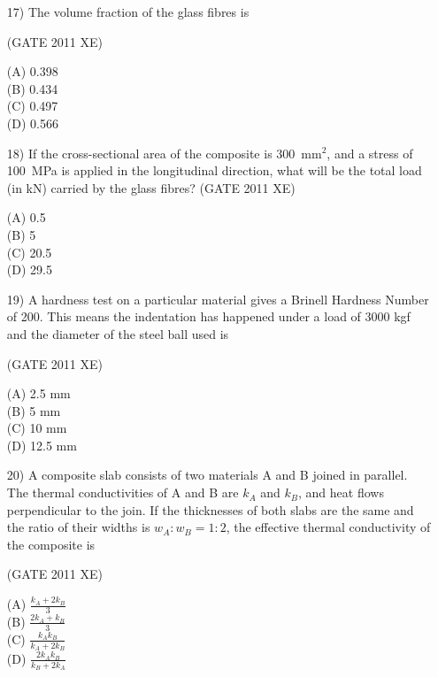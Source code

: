\documentclass[journal,12pt,onecolumn]{IEEEtran}
\begin{document}
\begin{enumerate}
\item[17)] The volume fraction of the glass fibres is

\hfill{(GATE 2011 XE)}\\
\begin{multicols}{4}
(A) 0.398 \\
(B) 0.434 \\
(C) 0.497 \\
(D) 0.566
\end{multicols}

\item[18)] If the cross-sectional area of the composite is 300~mm$^2$, and a stress of 100~MPa is applied in the longitudinal direction, what will be the total load (in kN) carried by the glass fibres?
\hfill{(GATE 2011 XE)}\\
\begin{multicols}{4}
(A) 0.5 \\
(B) 5 \\
(C) 20.5 \\
(D) 29.5
\end{multicols}

\newpage
\item[19)] A hardness test on a particular material gives a Brinell Hardness Number of 200. This means the indentation has happened under a load of 3000 kgf and the diameter of the steel ball used is

\hfill{(GATE 2011 XE)}\\
\begin{multicols}{4}
(A) 2.5 mm \\
(B) 5 mm \\
(C) 10 mm \\
(D) 12.5 mm
\end{multicols}


\item[20)] A composite slab consists of two materials A and B joined in parallel. The thermal conductivities of A and B are $k_A$ and $k_B$, and heat flows perpendicular to the join. If the thicknesses of both slabs are the same and the ratio of their widths is $w_A : w_B = 1:2$, the effective thermal conductivity of the composite is

\hfill{(GATE 2011 XE)}\\
\begin{multicols}{4}
(A) $\frac{k_A + 2k_B}{3}$ \\
(B) $\frac{2k_A + k_B}{3}$ \\
(C) $\frac{k_A k_B}{k_A + 2k_B}$ \\
(D) $\frac{2k_A k_B}{k_B + 2k_A}$
\end{multicols}

\end{enumerate}
\end{document}
